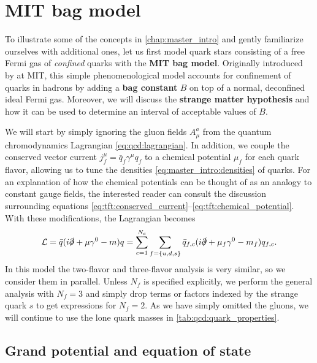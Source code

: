 \chapter{MIT bag model}
\label{chap:mit}

To illustrate some of the concepts in \cref{chap:master_intro} and gently familiarize ourselves with additional ones,
let us first model quark stars consisting of a free Fermi gas of \emph{confined} quarks with the \textbf{MIT bag model}.
Originally introduced by \cite{ref:mit_bag_model_original} at MIT, this simple phenomenological model accounts for confinement of quarks in hadrons by adding a \textbf{bag constant} $B$ on top of a normal, deconfined ideal Fermi gas.
Moreover, we will discuss the \textbf{strange matter hypothesis} and how it can be used to determine an interval of acceptable values of $B$.

We will start by simply ignoring the gluon fields $A_\mu^a$ from the quantum chromodynamics Lagrangian \eqref{eq:qcd:lagrangian}.
In addition, we couple the conserved vector current $j^\mu_f = \bar{q}_f \gamma^\mu q_f$ to a chemical potential $\mu_f$ for each quark flavor,
allowing us to tune the densities \eqref{eq:master_intro:densities} of quarks.
For an explanation of how the chemical potentials can be thought of as an analogy to constant gauge fields,
the interested reader can consult the discussion surrounding equations \eqref{eq:tft:conserved_current}--\eqref{eq:tft:chemical_potential}.
With these modifications, the Lagrangian becomes
\begin{equation}
	\mathcal{L} = \bar{q} (i \slashed\partial + \mu \gamma^0 - m) q
	      = \sum_{c=1}^{N_c} \sum_{f=\{u,d,s\}} \bar{q}_{f,c} (i \slashed\partial + \mu_f \gamma^0 - m_f) q_{f,c} .
\label{eq:mit:lagrangian}
\end{equation}
In this model the two-flavor and three-flavor analysis is very similar, so we consider them in parallel.
Unless $N_f$ is specified explicitly, we perform the general analysis with $N_f=3$
and simply drop terms or factors indexed by the strange quark $s$ to get expressions for $N_f = 2$.
As we have simply omitted the gluons, we will continue to use the lone quark masses in \cref{tab:qcd:quark_properties}.

\section{Grand potential and equation of state}
\label{sec:mit:eos}


